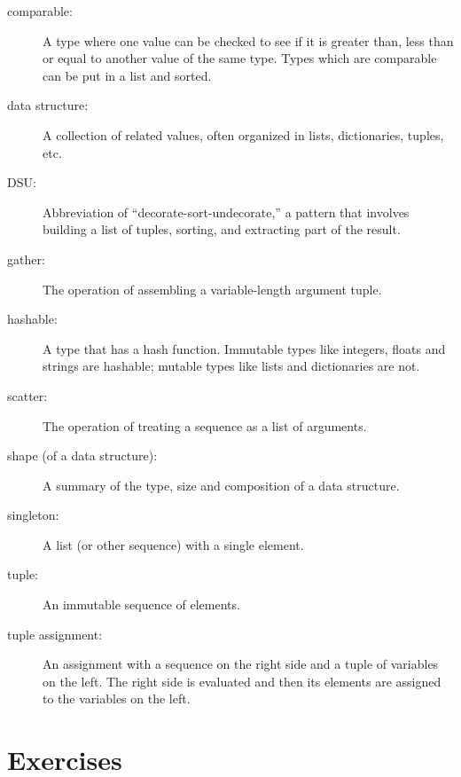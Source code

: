 \documentclass[10pt]{book}
\begin{document}
\begin{description}

\item[comparable:] A type where one value can be checked to see if it is
greater than, less than or equal to another value of the same type.
Types which are comparable can be put in a list and sorted.

\item[data structure:] A collection of related values, often
organized in lists, dictionaries, tuples, etc.

\item[DSU:] Abbreviation of ``decorate-sort-undecorate,'' a
pattern that involves building a list of tuples, sorting, and
extracting part of the result.

\item[gather:] The operation of assembling a variable-length
argument tuple.

\item[hashable:] A type that has a hash function.  Immutable
types like integers,
floats and strings are hashable; mutable types like lists and
dictionaries are not.

\item[scatter:] The operation of treating a sequence as a list of
arguments.

\item[shape (of a data structure):] A summary of the type,
size and composition of a data structure.

\item[singleton:] A list (or other sequence) with a single element.

\item[tuple:] An immutable sequence of elements.

\item[tuple assignment:] An assignment with a sequence on the
right side and a tuple of variables on the left.  The right
side is evaluated and then its elements are assigned to the
variables on the left.

\end{description}


\section{Exercises}
\end{document}
